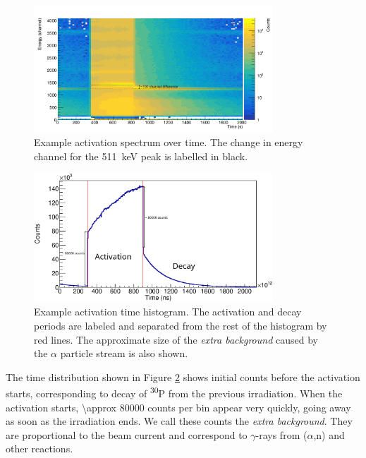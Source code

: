 \documentclass[a4paper,12pt]{report}
\newcommand{\an}{($\alpha$,n) }
\newcommand{\Piso}{\textsuperscript{30}P }
\begin{document}
\begin{figure}[H]
	\centering
	\includegraphics[width=0.80\textwidth]{example_activation_energytime.png} %
	\caption{Example activation spectrum over time.	%
	The change in energy channel for the \qty{511}{\keV} peak is labelled in black.}
	\label{example_activation_energytime}
\end{figure}

\begin{figure}[H]
	\centering
	\includegraphics[width=0.80\textwidth]{example_activation_time_histogram.eps}
	\caption{Example activation time histogram.
	The activation and decay periods are labeled and separated from the rest of the histogram by red lines.
	The approximate size of the \textit{extra background} caused by the $\alpha$ particle stream is also shown.}
	\label{example_activation_time_histogram}
\end{figure}

The time distribution shown in Figure \ref{example_activation_time_histogram} shows initial counts before the activation starts, corresponding to decay of \Piso from the previous irradiation.
When the activation starts, \num{\approx 80000} counts per bin appear very quickly, going away as soon as the irradiation ends.
We call these counts the \textit{extra background}.
They are proportional to the beam current and correspond to $\gamma$-rays from \an and other reactions.
\end{document}
